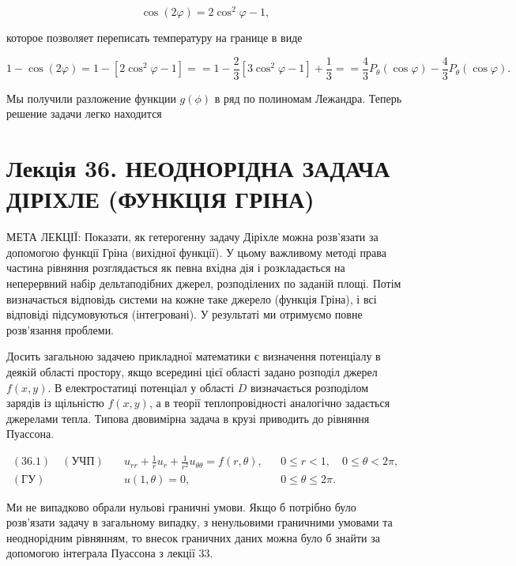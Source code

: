 \documentclass[
  ukrainian,
]{article}
\begin{document}
\[
\cos(2\varphi) = 2\cos^2\varphi - 1,
\]

которое позволяет переписать температуру на границе в виде

\[
1 - \cos(2\varphi) = 1 - [2\cos^2\varphi - 1] =
= 1 - \frac{2}{3}[3\cos^2\varphi - 1] + \frac{1}{3} =
= \frac{4}{3}P_{\theta}(\cos\varphi) - \frac{4}{3}P_{\theta}(\cos\varphi).
\]

Мы получили разложение функции \(g(\phi)\) в ряд по полиномам Лежандра.
Теперь решение задачи легко находится

\section{Лекція 36. НЕОДНОРІДНА ЗАДАЧА ДІРІХЛЕ (ФУНКЦІЯ
ГРІНА)}\label{ux43bux435ux43aux446ux456ux44f-36.-ux43dux435ux43eux434ux43dux43eux440ux456ux434ux43dux430-ux437ux430ux434ux430ux447ux430-ux434ux456ux440ux456ux445ux43bux435-ux444ux443ux43dux43aux446ux456ux44f-ux433ux440ux456ux43dux430}

МЕТА ЛЕКЦІЇ: Показати, як гетерогенну задачу Діріхле можна розв'язати за
допомогою функції Гріна (вихідної функції). У цьому важливому методі
права частина рівняння розглядається як певна вхідна дія і розкладається
на неперервний набір дельтаподібних джерел, розподілених по заданій
площі. Потім визначається відповідь системи на кожне таке джерело
(функція Гріна), і всі відповіді підсумовуються (інтегровані). У
результаті ми отримуємо повне розв'язання проблеми.

Досить загальною задачею прикладної математики є визначення потенціалу в
деякій області простору, якщо всередині цієї області задано розподіл
джерел \(f(x,y)\). В електростатиці потенціал у області \(D\)
визначається розподілом зарядів із щільністю \(f(x,y)\), а в теорії
теплопровідності аналогічно задається джерелами тепла. Типова двовимірна
задача в крузі приводить до рівняння Пуассона.

\[
\begin{aligned}(36.1)\quad (\text{УЧП})\quad &u_{rr} + \frac{1}{r}u_r + \frac{1}{r^2}u_{\theta\theta} = f(r,\theta),&& 0 \le r < 1,\quad 0 \le \theta < 2\pi, \\(\text{ГУ})\quad &u(1,\theta)=0,&& 0 \le \theta \le 2\pi.\end{aligned}
\]

Ми не випадково обрали нульові граничні умови. Якщо б потрібно було
розв'язати задачу в загальному випадку, з ненульовими граничними умовами
та неоднорідним рівнянням, то внесок граничних даних можна було б знайти
за допомогою інтеграла Пуассона з лекції 33.
\end{document}
